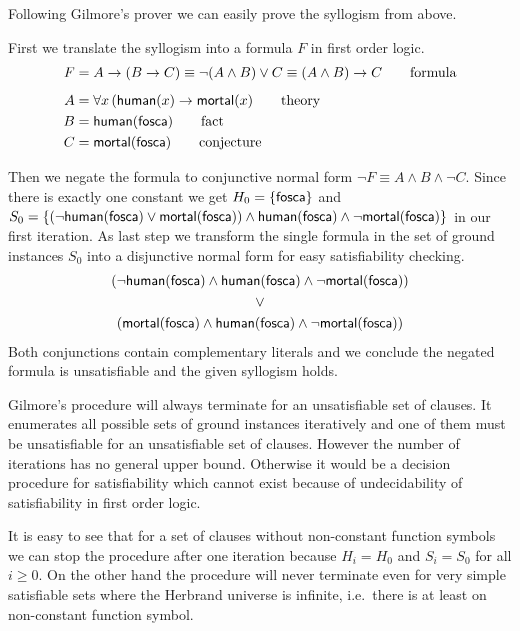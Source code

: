 Following Gilmore's prover we can easily prove the syllogism from above.

\begin{example}\label{ex:syllo}
	First we translate the syllogism into a formula $F$ in first order logic.
	\begin{align*}
		F &= A \rightarrow (B \rightarrow C) \equiv \lnot(A\land B) \lor C \equiv (A\land B)\rightarrow C  
		\tag*{formula}
		\\[0.5em]
		A &= \forall x\, ( \mathsf{human}(x) \rightarrow \mathsf{mortal}(x) 
		\tag*{theory}
		\\
		B &= \mathsf{human}(\mathsf{fosca}) 
		\tag*{fact}
		\\
		C &= \mathsf{mortal}(\mathsf{fosca})
		\tag*{conjecture}
	\end{align*}
 


	Then we negate the formula to conjunctive normal form $\lnot F \equiv A\land B \land\lnot C$.
	Since there is exactly one constant we get
	$H_0 = \{ \mathsf{fosca} \}$ and 
	$S_0 = 
	\{
	(\lnot\mathsf{human}(\mathsf{fosca})\lor\mathsf{mortal}(\mathsf{fosca}))\land\mathsf{human}(\mathsf{fosca})\land\lnot\mathsf{mortal}(\mathsf{fosca})
	\}$ in our first iteration. 
	As last step we transform the single formula in 
	the set of ground instances $S_0$ into a disjunctive normal form 
	for easy satisfiability checking.
%
\begin{gather*}
(\lnot\mathsf{human}(\mathsf{fosca})\land\mathsf{human}(\mathsf{fosca})\land\lnot\mathsf{mortal}(\mathsf{fosca}))
\\ 
\lor
\\ 
(\mathsf{mortal}(\mathsf{fosca})\land\mathsf{human}(\mathsf{fosca})\land\lnot\mathsf{mortal}(\mathsf{fosca}))
\end{gather*}
Both conjunctions contain complementary literals and we conclude the negated formula is unsatisfiable
 and the given syllogism holds.
 
\end{example}

Gilmore's procedure will always terminate for an unsatisfiable set of clauses.
It enumerates all possible sets of ground instances iteratively
and one of them must be unsatisfiable for an unsatisfiable set of clauses. 
However the number of iterations has no general upper bound. 
Otherwise it would be a decision procedure for satisfiability
which cannot exist because of undecidability of satisfiability in first order logic.

It is easy to see that for a set of clauses without non-constant function symbols
we can stop the procedure after one iteration because $H_i = H_0$ and $S_i = S_0$ for all $i\geq0$.
%
On the other hand the procedure will never terminate 
even for very simple satisfiable sets where the Herbrand universe is infinite, 
i.e.~there is at least on non-constant function symbol.

